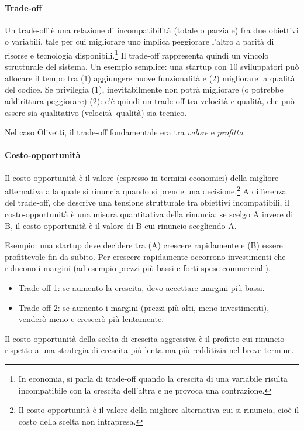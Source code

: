 \documentclass[a4paper,12pt]{article}
\begin{document}
	\paragraph{Trade-off}
	
	Un trade-off è una relazione di incompatibilità (totale o parziale) fra due obiettivi o variabili, tale per cui migliorare uno implica peggiorare l'altro a parità di risorse e tecnologia disponibili.\footnote{In economia, si parla di trade-off quando la crescita di una variabile risulta incompatibile con la crescita dell'altra e ne provoca una contrazione. } 
	Il trade-off rappresenta quindi un vincolo strutturale del sistema.%
	Un esempio semplice: una startup con 10 sviluppatori può allocare il tempo tra (1) aggiungere nuove funzionalità e (2) migliorare la qualità del codice.%
	Se privilegia (1), inevitabilmente non potrà migliorare (o potrebbe addirittura peggiorare) (2): c'è quindi un trade-off tra velocità e qualità, che può essere sia qualitativo (velocità–qualità) sia tecnico.
	
	Nel caso Olivetti, il trade-off fondamentale era tra \emph{valore} e \emph{profitto}.
	
	\paragraph{Costo-opportunità}
	
	Il costo-opportunità è il valore (espresso in termini economici) della migliore alternativa alla quale si rinuncia quando si prende una decisione.\footnote{Il costo-opportunità è il valore della migliore alternativa cui si rinuncia, cioè il costo della scelta non intrapresa. } 
	A differenza del trade-off, che descrive una tensione strutturale tra obiettivi incompatibili, il costo-opportunità è una misura quantitativa della rinuncia: se scelgo A invece di B, il costo-opportunità è il valore di B cui rinuncio scegliendo A.
	
	Esempio: una startup deve decidere tra (A) crescere rapidamente e (B) essere profittevole fin da subito.%
	Per crescere rapidamente occorrono investimenti che riducono i margini (ad esempio prezzi più bassi e forti spese commerciali).%
	\begin{itemize}
		\item Trade-off 1: se aumento la crescita, devo accettare margini più bassi.
		\item Trade-off 2: se aumento i margini (prezzi più alti, meno investimenti), venderò meno e crescerò più lentamente.
	\end{itemize}
	Il costo-opportunità della scelta di crescita aggressiva è il profitto cui rinuncio rispetto a una strategia di crescita più lenta ma più redditizia nel breve termine.
	
\end{document}
